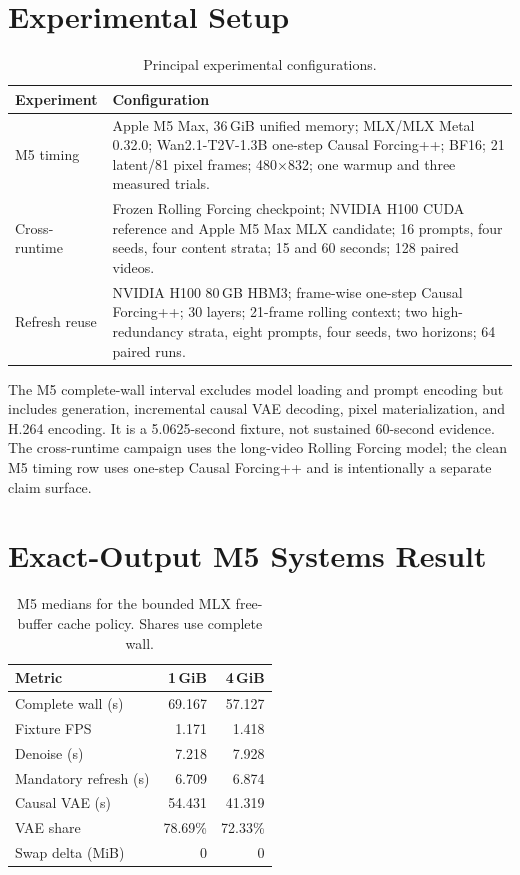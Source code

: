 \documentclass[10pt,twocolumn]{article}
\begin{document}
\section{Experimental Setup}
\begin{table}[t]
\centering
\caption{Principal experimental configurations.}
\label{tab:setup}
\small
\begin{tabular}{@{}p{}p{}@{}}
\toprule
Experiment & Configuration \\
\midrule
M5 timing & Apple M5 Max, 36\,GiB unified memory; MLX/MLX Metal 0.32.0; Wan2.1-T2V-1.3B one-step Causal Forcing++; BF16; 21 latent/81 pixel frames; 480$\times$832; one warmup and three measured trials. \\
Cross-runtime & Frozen Rolling Forcing checkpoint; NVIDIA H100 CUDA reference and Apple M5 Max MLX candidate; 16 prompts, four seeds, four content strata; 15 and 60 seconds; 128 paired videos. \\
Refresh reuse & NVIDIA H100 80\,GB HBM3; frame-wise one-step Causal Forcing++; 30 layers; 21-frame rolling context; two high-redundancy strata, eight prompts, four seeds, two horizons; 64 paired runs. \\
\bottomrule
\end{tabular}
\end{table}

The M5 complete-wall interval excludes model loading and prompt encoding but includes generation, incremental causal VAE decoding, pixel materialization, and H.264 encoding. It is a 5.0625-second fixture, not sustained 60-second evidence. The cross-runtime campaign uses the long-video Rolling Forcing model; the clean M5 timing row uses one-step Causal Forcing++ and is intentionally a separate claim surface.

\section{Exact-Output M5 Systems Result}
\begin{table}[t]
\centering
\caption{M5 medians for the bounded MLX free-buffer cache policy. Shares use complete wall.}
\label{tab:m5}
\small
\begin{tabular}{lrr}
\toprule
Metric & 1\,GiB & 4\,GiB \\
\midrule
Complete wall (s) & 69.167 & 57.127 \\
Fixture FPS & 1.171 & 1.418 \\
Denoise (s) & 7.218 & 7.928 \\
Mandatory refresh (s) & 6.709 & 6.874 \\
Causal VAE (s) & 54.431 & 41.319 \\
VAE share & 78.69\% & 72.33\% \\
Swap delta (MiB) & 0 & 0 \\
\bottomrule
\end{tabular}
\end{table}
\end{document}
